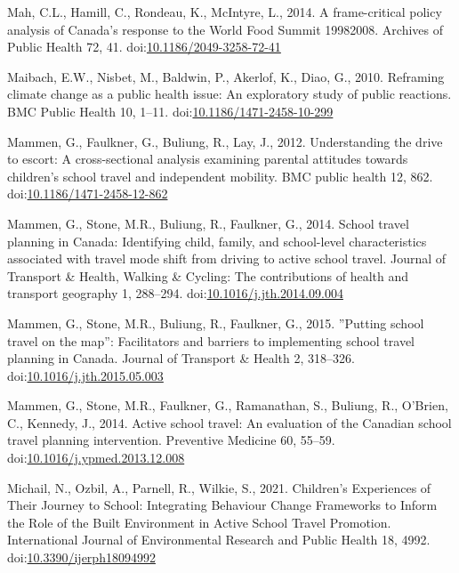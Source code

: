 \documentclass[]{elsarticle} %
\begin{document}
\leavevmode\hypertarget{ref-mahFramecriticalPolicyAnalysis2014}{}%
Mah, C.L., Hamill, C., Rondeau, K., McIntyre, L., 2014. A frame-critical
policy analysis of Canada's response to the World Food Summit 19982008.
Archives of Public Health 72, 41.
doi:\href{https://doi.org/10.1186/2049-3258-72-41}{10.1186/2049-3258-72-41}

\leavevmode\hypertarget{ref-maibachReframingClimateChange2010}{}%
Maibach, E.W., Nisbet, M., Baldwin, P., Akerlof, K., Diao, G., 2010.
Reframing climate change as a public health issue: An exploratory study
of public reactions. BMC Public Health 10, 1--11.
doi:\href{https://doi.org/10.1186/1471-2458-10-299}{10.1186/1471-2458-10-299}

\leavevmode\hypertarget{ref-mammenUnderstandingDriveEscort2012}{}%
Mammen, G., Faulkner, G., Buliung, R., Lay, J., 2012. Understanding the
drive to escort: A cross-sectional analysis examining parental attitudes
towards children's school travel and independent mobility. BMC public
health 12, 862.
doi:\href{https://doi.org/10.1186/1471-2458-12-862}{10.1186/1471-2458-12-862}

\leavevmode\hypertarget{ref-mammenSchoolTravelPlanning2014}{}%
Mammen, G., Stone, M.R., Buliung, R., Faulkner, G., 2014. School travel
planning in Canada: Identifying child, family, and school-level
characteristics associated with travel mode shift from driving to active
school travel. Journal of Transport \& Health, Walking \& Cycling: The
contributions of health and transport geography 1, 288--294.
doi:\href{https://doi.org/10.1016/j.jth.2014.09.004}{10.1016/j.jth.2014.09.004}

\leavevmode\hypertarget{ref-mammenPuttingSchoolTravel2015}{}%
Mammen, G., Stone, M.R., Buliung, R., Faulkner, G., 2015. ''Putting
school travel on the map'': Facilitators and barriers to implementing
school travel planning in Canada. Journal of Transport \& Health 2,
318--326.
doi:\href{https://doi.org/10.1016/j.jth.2015.05.003}{10.1016/j.jth.2015.05.003}

\leavevmode\hypertarget{ref-mammenActiveSchoolTravel2014}{}%
Mammen, G., Stone, M.R., Faulkner, G., Ramanathan, S., Buliung, R.,
O'Brien, C., Kennedy, J., 2014. Active school travel: An evaluation of
the Canadian school travel planning intervention. Preventive Medicine
60, 55--59.
doi:\href{https://doi.org/10.1016/j.ypmed.2013.12.008}{10.1016/j.ypmed.2013.12.008}

\leavevmode\hypertarget{ref-michailChildrenExperiencesTheir2021}{}%
Michail, N., Ozbil, A., Parnell, R., Wilkie, S., 2021. Children's
Experiences of Their Journey to School: Integrating Behaviour Change
Frameworks to Inform the Role of the Built Environment in Active School
Travel Promotion. International Journal of Environmental Research and
Public Health 18, 4992.
doi:\href{https://doi.org/10.3390/ijerph18094992}{10.3390/ijerph18094992}
\end{document}
